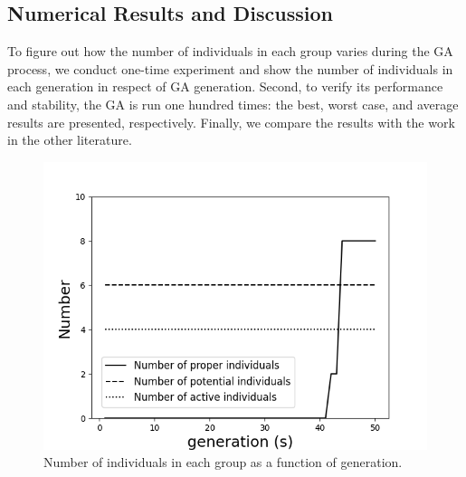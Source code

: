 \subsection{Numerical Results and Discussion}
To figure out how the number of individuals in each group varies during the GA
process, we conduct one-time experiment and show the number of individuals
in each generation in respect of GA generation. Second, to verify its
performance and stability, the GA is run one hundred times: the best, worst
case, and average results are presented, respectively. Finally, we compare
the results with the work in the other literature.

\begin{figure}[!tb]
	\centering
	\includegraphics[width=\linewidth]{Figures/chapter3/part1/fig/group_number.png}
	\caption{Number of individuals in each group as a function of generation.}
	\label{fig:group}
\end{figure}


